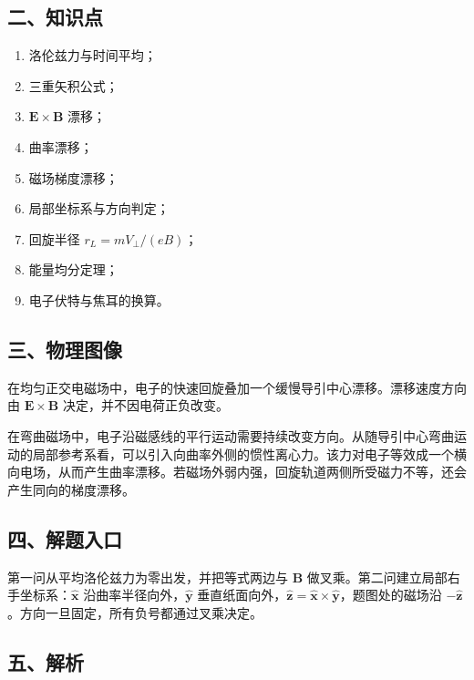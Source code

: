 \documentclass[12pt,a4paper,UTF8]{ctexart}
\newcommand{\tightlist}{\setlength{\itemsep}{0pt}\setlength{\parskip}{0pt}}
\begin{document}
\subsection{二、知识点}\label{ux4e8cux77e5ux8bc6ux70b9-5}

\begin{enumerate}
\def\labelenumi{\arabic{enumi}.}
\tightlist
\item
  洛伦兹力与时间平均；
\item
  三重矢积公式；
\item
  \(\boldsymbol E\times\boldsymbol B\) 漂移；
\item
  曲率漂移；
\item
  磁场梯度漂移；
\item
  局部坐标系与方向判定；
\item
  回旋半径 \(r_L=mV_\perp/(eB)\)；
\item
  能量均分定理；
\item
  电子伏特与焦耳的换算。
\end{enumerate}

\subsection{三、物理图像}\label{ux4e09ux7269ux7406ux56feux50cf-5}

在均匀正交电磁场中，电子的快速回旋叠加一个缓慢导引中心漂移。漂移速度方向由
\(\boldsymbol E\times\boldsymbol B\) 决定，并不因电荷正负改变。

在弯曲磁场中，电子沿磁感线的平行运动需要持续改变方向。从随导引中心弯曲运动的局部参考系看，可以引入向曲率外侧的惯性离心力。该力对电子等效成一个横向电场，从而产生曲率漂移。若磁场外弱内强，回旋轨道两侧所受磁力不等，还会产生同向的梯度漂移。

\subsection{四、解题入口}\label{ux56dbux89e3ux9898ux5165ux53e3-5}

第一问从平均洛伦兹力为零出发，并把等式两边与 \(\boldsymbol B\)
做叉乘。第二问建立局部右手坐标系：\(\hat{\boldsymbol x}\)
沿曲率半径向外，\(\hat{\boldsymbol y}\)
垂直纸面向外，\(\hat{\boldsymbol z}=\hat{\boldsymbol x}\times\hat{\boldsymbol y}\)，题图处的磁场沿
\(-\hat{\boldsymbol z}\)。方向一旦固定，所有负号都通过叉乘决定。

\subsection{五、解析}\label{ux4e94ux89e3ux6790-5}
\end{document}
